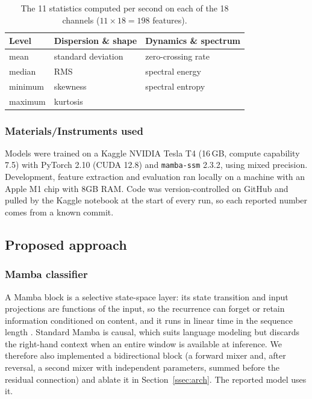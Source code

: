 \begin{table}[t]
  \centering
  \caption{The 11 statistics computed per second on each of the 18 channels
  ($11 \times 18 = 198$ features).}
  \label{tab:stats}
  \small
  \setlength{\tabcolsep}{4pt}
  \begin{tabular}{lll}
    \toprule
    Level & Dispersion \& shape & Dynamics \& spectrum \\
    \midrule
    mean    & standard deviation & zero-crossing rate \\
    median  & RMS                & spectral energy \\
    minimum & skewness           & spectral entropy \\
    maximum & kurtosis           & \\
    \bottomrule
  \end{tabular}
\end{table}

\subsubsection{Materials/Instruments used}
Models were trained on a Kaggle NVIDIA Tesla T4 (16\,GB, compute capability
7.5) with PyTorch 2.10 (CUDA 12.8) and \texttt{mamba-ssm} 2.3.2, using mixed
precision. Development, feature extraction and evaluation ran locally on a
machine with an Apple M1 chip with 8GB RAM. Code was version-controlled on
GitHub and pulled by the Kaggle notebook at the start of every run, so each
reported number comes from a known commit.

\subsection{Proposed approach}
\label{ssec:mod}

\subsubsection{Mamba classifier}
A Mamba block is a selective state-space layer: its state transition and input
projections are functions of the input, so the recurrence can forget or retain
information conditioned on content, and it runs in linear time in the sequence
length \cite{gu2023mamba}. Standard Mamba is causal, which suits language
modeling but discards the right-hand context when an entire window is available
at inference. We therefore also implemented a bidirectional block (a forward
mixer and, after reversal, a second mixer with independent parameters, summed
before the residual connection) and ablate it in Section~\ref{ssec:arch}. The
reported model uses it.

